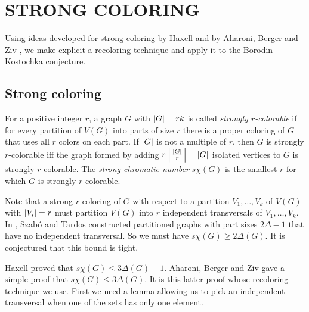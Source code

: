 \chapter{STRONG COLORING}\label{StrongColoringChapter}

Using ideas developed for strong coloring by Haxell \cite{haxell2004strong} and by Aharoni, Berger and Ziv \cite{aharoni2007independent}, we make explicit a recoloring technique and apply it to the Borodin-Kostochka conjecture.

\section{Strong coloring}
For a positive integer $r$, a graph $G$ with $\left|G\right| = rk$ is called \emph{strongly $r$-colorable} if for every partition of $V(G)$ into parts of size $r$ there is a proper coloring of $G$ that uses all $r$ colors on each part.  If $\left|G\right|$ is not a multiple of $r$, then $G$ is strongly $r$-colorable iff the graph formed by adding $r\left\lceil\frac{|G|}{r}\right\rceil - |G|$ isolated vertices to $G$ is strongly $r$-colorable.  The \emph{strong chromatic number} $s\chi(G)$ is the smallest $r$ for which $G$ is strongly $r$-colorable.

Note that a strong $r$-coloring of $G$ with respect to a partition $V_1, \ldots, V_k$ of $V(G)$ with $\left|V_i\right| = r$ must partition $V(G)$ into $r$ independent transversals of $V_1, \ldots, V_k$. In \cite{szabo2006extremal}, Szab{\'o} and Tardos constructed partitioned graphs with part sizes $2\Delta - 1$ that have no independent transversal.  So we must have $s\chi(G) \geq 2\Delta(G)$.  It is conjectured that this bound is tight.

Haxell \cite{haxell2004strong} proved that $s\chi(G) \leq 3\Delta(G) - 1$.  Aharoni, Berger and Ziv \cite{aharoni2007independent} gave a simple proof that $s\chi(G) \leq 3\Delta(G)$.  It is this latter proof whose recoloring technique we use.  First we need a lemma allowing us to pick an independent transversal when one of the sets has only one element.


